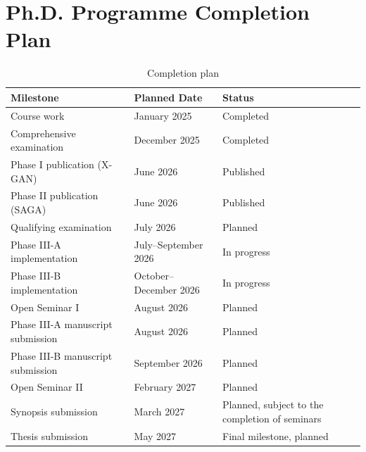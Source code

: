 
\section{Ph.D. Programme Completion Plan}
\label{sec:cp}
\begin{table}[H]
	\centering
	\caption{Completion plan}
	\label{tab:plan}
	\begin{tabular}{lp{3cm}p{6cm}}
		\toprule
		Milestone & Planned Date & Status \\
		\midrule
		Course work & January 2025 & Completed \\
		Comprehensive examination & December 2025 & Completed \\
		Phase I publication (X-GAN) & June 2026 & Published \\
		Phase II publication (SAGA) & June 2026 & Published \\
		Qualifying examination& July 2026&Planned\\
		Phase III-A implementation & July–September 2026 & In progress \\
		Phase III-B implementation & October–December 2026 & In progress \\
		Open Seminar I & August 2026 & Planned \\
		Phase III-A manuscript submission & August 2026 & Planned \\
		Phase III-B manuscript submission & September 2026 & Planned \\
		Open Seminar II & February 2027 & Planned \\
		Synopsis submission & March 2027 & Planned, subject to the completion of seminars \\
		Thesis submission & May 2027 & Final milestone, planned \\
		\bottomrule
	\end{tabular}
\end{table}